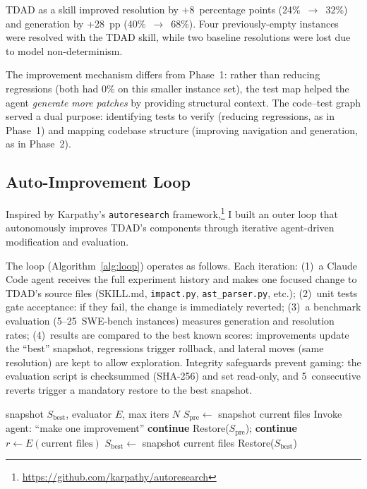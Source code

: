 \documentclass[sigconf,nonacm]{acmart}
\begin{document}
\textsc{TDAD} as a skill improved resolution by +8~percentage points
(24\%~$\to$~32\%) and generation by +28~pp (40\%~$\to$~68\%).  Four
previously-empty instances were resolved with the TDAD skill, while two
baseline resolutions were lost due to model non-determinism.

The improvement mechanism differs from Phase~1: rather than reducing
regressions (both had 0\% on this smaller instance set), the test map helped
the agent \emph{generate more patches} by providing structural context.
The code--test graph served a dual purpose: identifying tests to verify
(reducing regressions, as in Phase~1) and mapping codebase structure
(improving navigation and generation, as in Phase~2).

\subsection{Auto-Improvement Loop}
\label{sec:autoloop}

Inspired by Karpathy's \texttt{autoresearch} framework,\footnote{\url{https://github.com/karpathy/autoresearch}}
I built an outer loop that autonomously improves \textsc{TDAD}'s components
through iterative agent-driven modification and evaluation.

The loop (Algorithm~\ref{alg:loop}) operates as follows.  Each iteration:
(1)~a Claude Code agent receives the full experiment history and makes one
focused change to \textsc{TDAD}'s source files (SKILL.md,
\texttt{impact.py}, \texttt{ast\_parser.py}, etc.); (2)~unit tests gate
acceptance: if they fail, the change is immediately reverted;
(3)~a benchmark evaluation (5--25~SWE-bench instances) measures generation
and resolution rates; (4)~results are compared to the best known scores:
improvements update the ``best'' snapshot, regressions trigger rollback,
and lateral moves (same resolution) are kept to allow exploration.
Integrity safeguards prevent gaming: the evaluation script is checksummed
(SHA-256) and set read-only, and 5~consecutive reverts trigger a mandatory
restore to the best snapshot.

\begin{algorithm}[t]
\caption{Auto-improvement loop.}
\label{alg:loop}
\begin{algorithmic}[1]
\Require snapshot $S_\text{best}$, evaluator $E$, max iters $N$
  \State $S_\text{pre} \gets$ snapshot current files
  \State Invoke agent: ``make one improvement''
   \textbf{continue} \EndIf
    \State Restore($S_\text{pre}$); \textbf{continue}
  \EndIf
  \State $r \gets E(\text{current files})$
    \State $S_\text{best} \gets$ snapshot current files
    \State Restore($S_\text{best}$)
  \EndIf {}
\EndFor
\end{algorithmic}
\end{algorithm}
\end{document}
